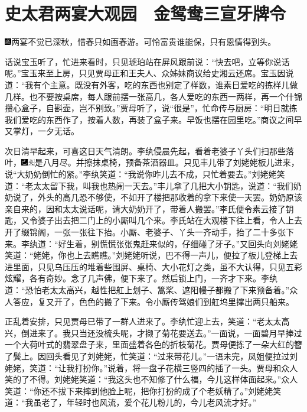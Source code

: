 

\chapter{史太君两宴大观园　金鸳鸯三宣牙牌令}
{\includegraphics[width=3mm]{../Images/00005}两宴不觉已深秋，惜春只如画春游。可怜富贵谁能保，只有恩情得到头。}

话说宝玉听了，忙进来看时，只见琥珀站在屏风跟前说：``快去吧，立等你说话呢。''宝玉来至上房，只见贾母正和王夫人、众姊妹商议给史湘云还席。宝玉因说道：``我有个主意。既没有外客，吃的东西也别定了样数，谁素日爱吃的拣样儿做几样。也不要按桌席，每人跟前摆一张高几，各人爱吃的东西一两样，再一个什锦攒心盒子，自斟壶，岂不别致。''贾母听了，说``很是''，忙命传与厨房：``明日就拣我们爱吃的东西作了，按着人数，再装了盒子来。早饭也摆在园里吃。''商议之间早又掌灯，一夕无话。

次日清早起来，可喜这日天气清朗。李纨侵晨先起，看着老婆子丫头们扫那些落叶，{\includegraphics[width=3mm]{../Images/00003}\includegraphics[width=3mm]{../Images/00012}\footnotesize \kaishu 是八月尽。}并擦抹桌椅，预备茶酒器皿。只见丰儿带了刘姥姥板儿进来，说``大奶奶倒忙的紧。''李纨笑道：``我说你昨儿去不成，只忙着要去。''刘姥姥笑道：``老太太留下我，叫我也热闹一天去。''丰儿拿了几把大小钥匙，说道：``我们奶奶说了，外头的高几恐不够使，不如开了楼把那收着的拿下来使一天罢。奶奶原该亲自来的，因和太太说话呢，请大奶奶开了，带着人搬罢。''李氏便令素云接了钥匙，又令婆子出去把二门上的小厮叫几个来。李氏站在大观楼下往上看，令人上去开了缀锦阁，一张一张往下抬。小厮、老婆子、丫头一齐动手，抬了二十多张下来。李纨道：``好生着，别慌慌张张鬼赶来似的，仔细碰了牙子。''又回头向刘姥姥笑道：``姥姥，你也上去瞧瞧。''刘姥姥听说，巴不得一声儿，便拉了板儿登梯上去进里面，只见乌压压的堆着些围屏、桌椅、大小花灯之类，虽不大认得，只见五彩炫耀，各有奇妙。念了几声佛，便下来了。然后锁上门，一齐才下来。李纨道：``恐怕老太太高兴，越性把舡上划子、篙桨、遮阳幔子都搬了下来预备着。''众人答应，复又开了，色色的搬了下来。令小厮传驾娘们到舡坞里撑出两只船来。

正乱着安排，只见贾母已带了一群人进来了。李纨忙迎上去，笑道：``老太太高兴，倒进来了。我只当还没梳头呢，才撷了菊花要送去。''一面说，一面碧月早捧过一个大荷叶式的翡翠盘子来，里面盛着各色的折枝菊花。贾母便拣了一朵大红的簪了鬓上。因回头看见了刘姥姥，忙笑道：``过来带花儿。''一语未完，凤姐便拉过刘姥姥，笑道：``让我打扮你。''说着，将一盘子花横三竖四的插了一头。贾母和众人笑的了不得。刘姥姥笑道：``我这头也不知修了什么福，今儿这样体面起来。''众人笑道：``你还不拔下来摔到他脸上呢，把你打扮的成了个老妖精了。''刘姥姥笑道：``我虽老了，年轻时也风流，爱个花儿粉儿的，今儿老风流才好。''

